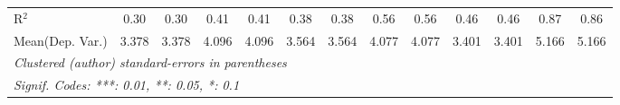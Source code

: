 \begin{tabular}{lcccccccccccc}
   R$^2$                                    & 0.30         & 0.30          & 0.41         & 0.41         & 0.38         & 0.38          & 0.56          & 0.56          & 0.46        & 0.46         & 0.87        & 0.86\\  
Mean(Dep. Var.) & 3.378 & 3.378 & 4.096 & 4.096 & 3.564 & 3.564 & 4.077 & 4.077 & 3.401 & 3.401 & 5.166 & 5.166 \\
   \midrule \midrule
   \multicolumn{13}{l}{\emph{Clustered (author) standard-errors in parentheses}}\\
   \multicolumn{13}{l}{\emph{Signif. Codes: ***: 0.01, **: 0.05, *: 0.1}}\\
\end{tabular}
\par\endgroup
